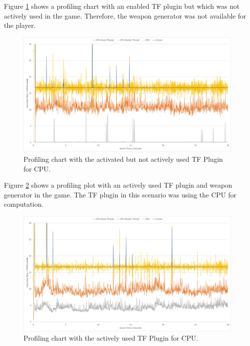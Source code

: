 \documentclass[MGS,Master,english]{twbook}%
\begin{document}
Figure \ref{scenario::profiling_TF} shows a profiling chart with an enabled \ac{TF} plugin but which was not actively used in the game. Therefore, the weapon generator was not available for the player.
\begin{figure}[!ht]
	\centering
	\includegraphics[width=1.0\linewidth]{PICs/Profiling/activated_plugin_no_tf_used}
	\caption{Profiling chart with the activated but not actively used \ac{TF} Plugin for \ac{CPU}.} \label{scenario::profiling_TF}
\end{figure}

Figure \ref{scenario::profiling_CPU} shows a profiling plot with an actively used \ac{TF} plugin and weapon generator in the game. The \ac{TF} plugin in this scenario was using the \ac{CPU} for computation. 
\begin{figure}[!ht]
	\centering
	\includegraphics[width=1.0\linewidth]{PICs/Profiling/tf_cpu}
	\caption{Profiling chart with the actively used \ac{TF} Plugin for \ac{CPU}.} \label{scenario::profiling_CPU}
\end{figure}
\end{document}
